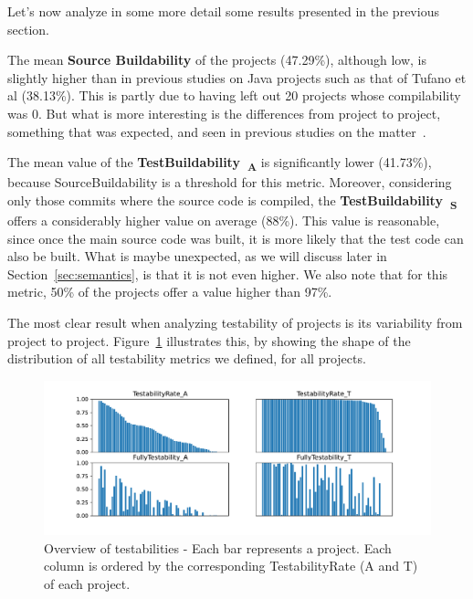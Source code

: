 Let's now analyze in some more detail some results presented in the previous section.

The mean \textbf{Source Buildability} of the projects (47.29\%), although low, is slightly higher than in previous studies on Java projects such as that of Tufano et al (38.13\%). 
This is partly due to having left out 20 projects whose compilability was 0.
But what is more interesting is the differences from project to project, something that was expected, and seen in previous studies on the matter~\cite{tufano2017there,sulir2020large,querel:2021:warning}.

The mean value of the \textbf{TestBuildability~\textsubscript{A}} is significantly lower (41.73\%), because SourceBuildability is a threshold for this metric.
Moreover, considering only those commits where the source code is compiled, the \textbf{TestBuildability~\textsubscript{S}} offers a considerably higher value on average (88\%).
This value is reasonable, since once the main source code was built, it is more likely that the test code can also be built. 
What is maybe unexpected, as we will discuss later in Section~\ref{sec:semantics}, is that it is not even higher.
We also note that for this metric, 50\% of the projects offer a value higher than 97\%.



The most clear result when analyzing testability of projects is its variability from project to project. 
Figure~\ref{fig:testability-overview} illustrates this, by showing the shape of the distribution of all testability metrics we defined, for all projects.

\begin{figure}[ht!]
    \centering    
    \includegraphics[width=16cm]{pages/02-Testability/images/Overview.pdf}
    \vspace{-0.5cm}
    \caption{Overview of testabilities - Each bar represents a project. Each column is ordered by the corresponding TestabilityRate (A and T) of each project.}
    \label{fig:testability-overview}
\end{figure}

